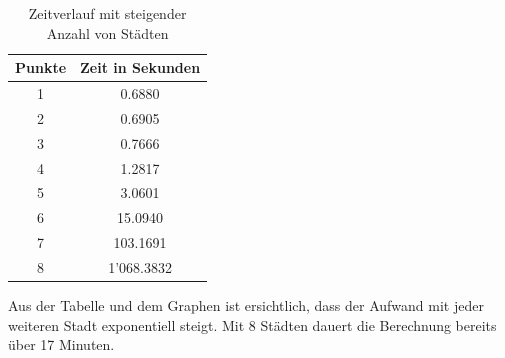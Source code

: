 \begin{table}[ht]
    \centering
    \caption{Zeitverlauf mit steigender Anzahl von Städten}
    \begin{tabular}{cc}
        \toprule
        Punkte & Zeit in Sekunden      \\
        \midrule
        1      & 0.6880     \\
        2      & 0.6905     \\
        3      & 0.7666     \\
        4      & 1.2817     \\
        5      & 3.0601     \\
        6      & 15.0940    \\
        7      & 103.1691   \\
        8      & 1'068.3832 \\
        \bottomrule
    \end{tabular}
\end{table}

Aus der Tabelle und dem Graphen ist ersichtlich, dass der Aufwand mit 
jeder weiteren Stadt exponentiell steigt. Mit 8 Städten dauert die
Berechnung bereits über 17 Minuten.
